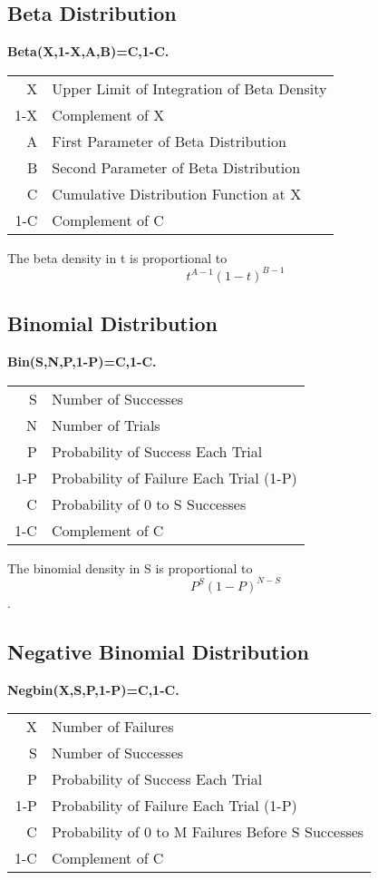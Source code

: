 \documentclass[12pt,dvips]{article}
\newcommand{\mysubsection}[1]
    {\color{green}\subsection{#1}\color{black}}
\begin{document}
\mysubsection{Beta Distribution}

{\bf \centering Beta(X,1-X,A,B)=C,1-C.\\}

\begin{center}
\begin{tabular}{rl}
           X & Upper Limit of Integration of Beta Density\\
         1-X & Complement of X\\
           A & First Parameter of Beta Distribution\\
           B & Second Parameter of Beta Distribution\\
           C & Cumulative Distribution Function at X\\
         1-C & Complement of C\\
\end{tabular}
\end{center}
     The beta density in t is proportional to
\[ t^{A-1} (1-t)^{B-1} \]

\mysubsection{Binomial Distribution}
     
{\bf \centering Bin(S,N,P,1-P)=C,1-C.\\}
\begin{center}
\begin{tabular}{rl}
           S & Number of Successes\\
           N & Number of Trials\\
           P & Probability of Success Each Trial\\
         1-P & Probability of Failure Each Trial (1-P)\\
           C & Probability of 0 to S Successes\\
         1-C & Complement of C\\
\end{tabular}
\end{center}

     The binomial density in S is proportional to 
\[ P^S (1-P)^{N-S} \].


\mysubsection{Negative Binomial Distribution}
     
{\bf \centering Negbin(X,S,P,1-P)=C,1-C.\\}

\begin{center}
\begin{tabular}{rl}
            X & Number of Failures\\
            S & Number of Successes\\
            P & Probability of Success Each Trial\\
          1-P & Probability of Failure Each Trial (1-P)\\
            C & Probability of 0 to M Failures Before S Successes\\
          1-C & Complement of C\\
\end{tabular}
\end{center}
\end{document}
